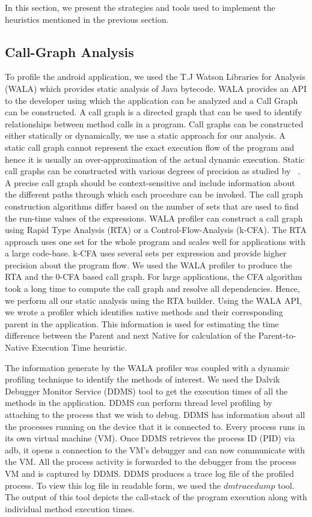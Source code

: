 In this section, we present the strategies and tools used to implement the heuristics mentioned in the previous section.


\subsection{Call-Graph Analysis}
To profile the android application, we used the T.J Watson Libraries for Analysis (WALA) which provides static analysis
of Java bytecode. WALA provides an API to the developer using which the application can be analyzed and a Call Graph can be
constructed. A call graph is a directed graph that can be used to identify relationships between method calls in a program.
Call graphs can be constructed either statically or dynamically, we use a static approach for our analysis. A static
call graph cannot represent the exact execution flow of the program and hence it is usually an over-approximation of
the actual dynamic execution. Static call graphs can be constructed with various degrees of precision as studied by
~\cite{cgbuild}. A precise call graph should be context-sensitive and include information about the different paths through which
each procedure can be invoked. The call graph construction algorithms differ based on the number of sets that are used to find the
run-time values of the expressions. WALA profiler can construct a call graph using Rapid Type Analysis (RTA) or a Control-Flow-Analysis
(k-CFA). The RTA approach uses one set for the whole program and scales well for applications with a large code-base. k-CFA uses
several sets per expression and provide higher precision about the program flow.
We used the WALA profiler to produce the RTA and the 0-CFA based call graph. For large applications, the CFA algorithm took a long time to
compute the call graph and resolve all dependencies. Hence, we perform all our static analysis using the RTA builder. Using the WALA API,
we wrote a profiler which identifies native methods and their corresponding parent in the application.
This information is used for estimating the time difference between the Parent and next Native for calculation of the Parent-to-Native Execution
Time heuristic.

The information generate by the WALA profiler was coupled with a dynamic profiling technique to identify the methods of interest.
We used the Dalvik Debugger Monitor Service (DDMS) tool to get the execution times of all the methods in the application. DDMS can perform
thread level profiling by attaching to the process that we wish to debug. DDMS has information about all the processes running on the device
that it is connected to. Every process runs in its own virtual machine (VM). Once DDMS retrieves the process ID (PID) via adb, it opens a
connection to the VM's debugger and can now communicate with the VM. All the process activity is forwarded to the debugger from the process VM
and is captured by DDMS. DDMS produces a trace log file of the profiled process. To view this log file in readable form, we used the
$dmtracedump$ tool. The output of this tool depicts the call-stack of the program execution along with individual method execution times.

